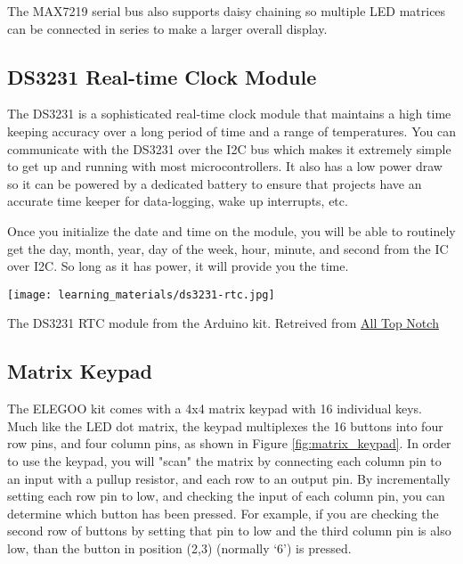     The MAX7219 serial bus also supports daisy chaining so multiple LED matrices can be connected in series to make a larger overall display.

    \subsection*{DS3231 Real-time Clock Module}
    The DS3231 is a sophisticated real-time clock module that maintains a high time keeping accuracy over a long period of time and a range of temperatures.
    You can communicate with the DS3231 over the I2C bus which makes it extremely simple to get up and running with most microcontrollers.
    It also has a low power draw so it can be powered by a dedicated battery to ensure that projects have an accurate time keeper for data-logging, wake up interrupts, etc.

    Once you initialize the date and time on the module, you will be able to routinely get the day, month, year, day of the week, hour, minute, and second from the IC over I2C. So long as it has power, it will provide you the time.

    \begin{marginfigure}[-2in]
        \texttt{[image: learning\_materials/ds3231-rtc.jpg]}
        \caption[DS3231 RTC Module]{The DS3231 RTC module from the Arduino kit. 
        Retreived from \href{https://alltopnotch.co.uk/wp-content/uploads/imported/9/RTC-Real-Time-Clock-DS3231-I2C-AT24C32-Board-Module-Arduino-ARM-PIC-UK-Seller-361515587149-4.JPG}
        {All Top Notch}}
    \end{marginfigure}

    \subsection*{Matrix Keypad}
    The ELEGOO kit comes with a 4x4 matrix keypad with 16 individual keys.
    Much like the LED dot matrix, the keypad multiplexes the 16 buttons into four row pins, and four column pins, as shown in Figure \ref{fig:matrix_keypad}.
    In order to use the keypad, you will "scan" the matrix by connecting each column pin to an input with a pullup resistor, and each row to an output pin.
    By incrementally setting each row pin to low, and checking the input of each column pin, you can determine which button has been pressed.
    For example, if you are checking the second row of buttons by setting that pin to low and the third column pin is also low, than the button in position (2,3) (normally `6') is pressed.

